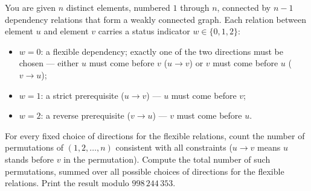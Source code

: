 You are given $n$ distinct elements, numbered $1$ through $n$, connected by $n - 1$ dependency relations that form a weakly connected graph. Each relation between element $u$ and element $v$ carries a status indicator $w \in \{0, 1, 2\}$:

\begin{itemize}
  \item $w = 0$: a flexible dependency; exactly one of the two directions must be chosen --- either $u$ must come before $v$ ($u \to v$) or $v$ must come before $u$ ($v \to u$);
  \item $w = 1$: a strict prerequisite ($u \to v$) --- $u$ must come before $v$;
  \item $w = 2$: a reverse prerequisite ($v \to u$) --- $v$ must come before $u$.
\end{itemize}

For every fixed choice of directions for the flexible relations, count the number of permutations of $(1, 2, \dots, n)$ consistent with all constraints ($u \to v$ means $u$ stands before $v$ in the permutation). Compute the total number of such permutations, summed over all possible choices of directions for the flexible relations. Print the result modulo $998\,244\,353$.
